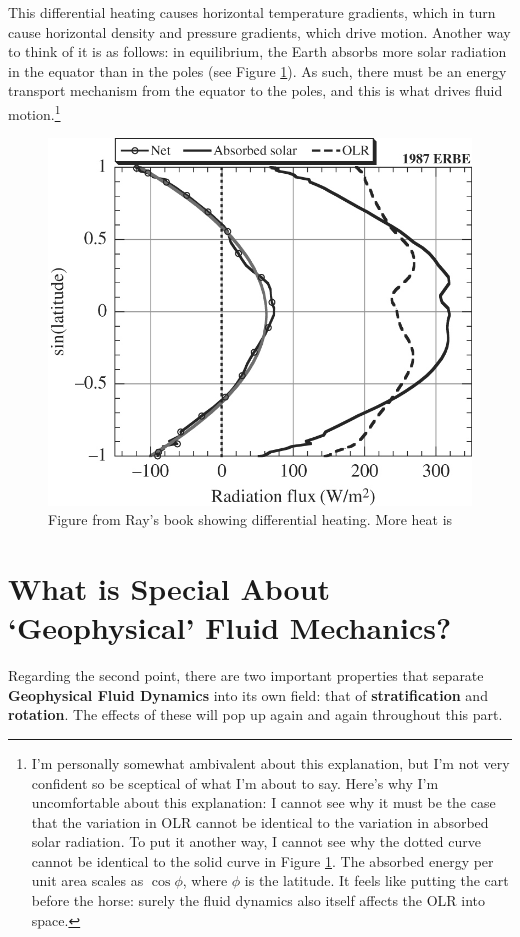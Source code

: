 This differential heating causes horizontal temperature gradients, which in turn cause horizontal density and pressure gradients, which drive motion. Another way to think of it is as follows: in equilibrium, the Earth absorbs more solar radiation in the equator than in the poles (see Figure \ref{Diff Heating}). As such, there must be an energy transport mechanism from the equator to the poles, and this is what drives fluid motion.\footnote{
    I'm personally somewhat ambivalent about this explanation, but I'm not very confident so be sceptical of what I'm about to say. Here's why I'm uncomfortable about this explanation: I cannot see why it must be the case that the variation in OLR cannot be identical to the variation in absorbed solar radiation. To put it another way, I cannot see why the dotted curve cannot be identical to the solid curve in Figure \ref{Diff Heating}. The absorbed energy per unit area scales as $\cos\phi$, where $\phi$ is the latitude. It feels like putting the cart before the horse: surely the fluid dynamics also itself affects the OLR into space.
}

\begin{figure}[H]
    \centering
    \includegraphics[width=0.5\linewidth]{Figures/GFD/Diff Heating.jpg}
    \caption{Figure from Ray's book showing differential heating. More heat is }
    \label{Diff Heating}
\end{figure}

\section{What is Special About `Geophysical' Fluid Mechanics?}

Regarding the second point, there are two important properties that separate \textbf{Geophysical Fluid Dynamics} into its own field: that of \textbf{stratification} and \textbf{rotation}. The effects of these will pop up again and again throughout this part.

